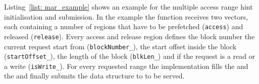 Listing~\ref{list: mar_example} shows an example for the multiple access range hint initialisation and submission. In the example the  function receives two vectors, each containing a number of regions that have to be prefetched (\texttt{access}) and released (\texttt{release}). Every access and release region defines the block number the current request start from (\texttt{blockNumber\_}), the start offset inside the block (\texttt{startOffset\_}), the length of the block (\texttt{blkLen\_}) and if the request is a read or a write (\texttt{isWrite\_}). For every requested range the implementation fills the  and the  and finally submits the data structure to  to be served.
